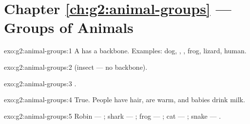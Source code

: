 \section*{Chapter \ref{ch:g2:animal-groups} --- Groups of Animals}

\begin{solution}{exo:g2:animal-groups:1}
A  has a backbone. Examples: dog, , , frog,
lizard, human.
\end{solution}

\begin{solution}{exo:g2:animal-groups:2}
 (insect --- no backbone).
\end{solution}

\begin{solution}{exo:g2:animal-groups:3}
.
\end{solution}

\begin{solution}{exo:g2:animal-groups:4}
True. People have hair, are warm, and babies drink milk.
\end{solution}

\begin{solution}{exo:g2:animal-groups:5}
Robin --- ; shark --- ; frog --- ; cat --- ;
snake --- .
\end{solution}

